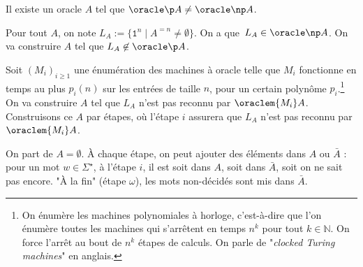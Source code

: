 \documentclass[./main]{subfiles}
\begin{document}
  \begin{prop}
    Il existe un oracle $A$ tel que $\oracle \p A \neq \oracle \np A$.
  \end{prop}
  \begin{prv}
    Pour tout $A$, on note $L_A := \{\texttt{1}^n  \mid A^{=n} \neq \emptyset\}$.
    On a que~$L_A \in \oracle \np A$. On va construire $A$ tel que $L_A \not\in \oracle \p A$.

    Soit $(M_i)_{i \ge 1}$ une énumération des machines à oracle telle que $M_i$ fonctionne en temps au plus $p_i(n)$ sur les entrées de taille $n$, pour un certain polynôme $p_i$.\footnote{On énumère les machines polynomiales à horloge, c'est-à-dire que l'on énumère toutes les machines qui s'arrêtent en temps $n^k$ pour tout $k \in \mathds{N}$. On force l'arrêt au bout de $n^k$ étapes de calculs. On parle de "\textit{clocked Turing machines}" en anglais.}
    On va construire $A$ tel que $L_A$ n'est pas reconnu par $\oraclem {M_i} A$.
    Construisons ce $A$ par étapes, où l'étape $i$ assurera que $L_A$ n'est pas reconnu par $\oraclem{M_i} A$.

    On part de $A = \emptyset$.
    À chaque étape, on peut ajouter des éléments dans $A$ ou $\bar{A}$ :
    pour un mot $w \in \Sigma^\star$, à l'étape $i$, il est soit dans $A$, soit dans $\bar{A}$, soit on ne sait pas encore.
    "À la fin" (étape $\omega$), les mots non-décidés sont mis dans $\bar{A}$.


\end{prv}
\end{document}
